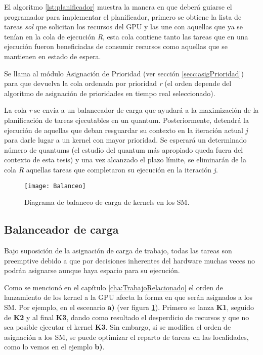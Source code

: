 El algoritmo \ref{lst:planificador} muestra la manera en que deberá guiarse el programador para implementar el planificador, primero se obtiene la lista de tareas \textit{sol} que solicitan los recursos del GPU y las une con aquellas que ya se tenían en la cola de ejecución \textit{R}, esta cola contiene tanto las tareas que en una ejecución fueron beneficiadas de consumir recursos como aquellas que se mantienen en estado de espera.
\newline

Se llama al módulo Asignación de Prioridad (ver sección \ref{secc:asigPrioridad}) para que devuelva la cola ordenada por prioridad \textit{r} (el orden depende del algoritmo de asignación de prioridades en tiempo real seleccionado).
\newline



La cola \textit{r} se envía a un balanceador de carga que ayudará a la maximización de la planificación de tareas ejecutables en un quantum. Posteriormente, detendrá la ejecución de aquellas que deban resguardar su contexto en la iteración actual \textit{j} para darle lugar a un kernel con mayor prioridad.
Se esperará un determinado número de quantums (el estudio del quantum más apropiado queda fuera del contexto de esta tesis) y una vez alcanzado el plazo límite, se eliminarán de la cola \textit{R} aquellas tareas que completaron su ejecución en la iteración \textit{j}. 


    \begin{figure}[!]
      \centering
        \texttt{[image: Balanceo]}
        \caption{Diagrama de balanceo de carga de kernels en los SM.}
        \label{fig:Balanceo}
    \end{figure}
    
\subsection{Balanceador de carga} \label{secc:balanceador}

Bajo suposición de la asignación de carga de trabajo, todas las tareas son preemptive debido a que por decisiones inherentes del hardware muchas veces no podrán asignarse aunque haya espacio para su ejecución.
\newline

Como se mencionó en el capítulo \ref{cha:TrabajoRelacionado} el orden de lanzamiento de los kernel a la GPU afecta la forma en que serán asignados a los SM. Por ejemplo, en el escenario \textbf{a)} (ver figura \ref{fig:Balanceo}). Primero se lanza \textbf{K1}, seguido de \textbf{K2} y al final \textbf{K3}, dando como resultado el desperdicio de recursos y que no sea posible ejecutar el kernel \textbf{K3}. Sin embargo, si se modifica el orden de asignación a los SM, se puede optimizar el reparto de tareas en las localidades, como lo vemos en el ejemplo \textbf{b)}.

